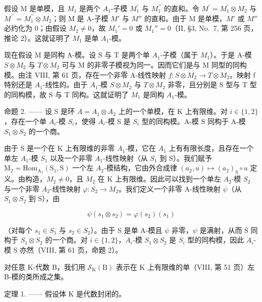 假设 M 是单模，且 \(M_{1}\) 是两个 \(A_{1}\)-子模 \(M_{1}^{\prime}\) 与 \(M_{1}^{\prime\prime}\) 的直和。令 \(M^{\prime}=M_{1}^{\prime}\otimes M_{2}\) 与 \(M^{\prime\prime}=M_{1}^{\prime\prime}\otimes M_{2}\)；则 M 是 A-子模 \(M'\) 与 \(M''\) 的直和。由于 M 是单模，\(M'\) 或 \(M''\) 必约化为 0；由假设 \(M_{2} \neq 0\)，故 \(M_{1}' = 0\) 或 \(M_{1}'' = 0\)（II, §3, No.~7, 第 256 页，推论 2）。这就证明了 \(M_{1}\) 是单 \(A_{1}\)-模。

现在假设 M 是同构 A-模。设 S 与 T 是两个单 \(A_{1}\)-子模（属于 \(M_{1}\)）。于是 A-模 \(S \otimes M_{2}\) 与 \(T \otimes M_{2}\) 可与 M 的非零子模视为同一。因而它们是与 M 同型的同构模。由注 VIII, 第 61 页，存在一个非零 A-线性映射 \(f : S \otimes M_{2} \to T \otimes M_{2}\)。映射 f 特别还是 \(A_{1}\)-线性的。由于 \(A_{1}\)-模 \(S \otimes M_{2}\) 与 \(T \otimes M_{2}\) 非零，且分别是 S 型与 T 型的同构模，故 S 与 T 同构。这就证明了 \(M_{1}\) 是同构 \(A_{1}\)-模。

命题 2. —— 设 S 是环 \(A = A_{1} \otimes A_{2}\) 上的一个单模，在 K 上有限维。对 \(i \in \{1, 2\}\)，存在一个单 \(A_{i}\)-模 \(S_{i}\)，使得 \(A_{i}\)-模 S 是 \(S_{i}\) 型的同构模。A-模 S 同构于 A-模 \(S_{1} \otimes S_{2}\) 的一个商。

由于 S 是一个在 K 上有限维的非零 \(A_{1}\)-模，它在 \(A_{1}\) 上有有限长度，且存在一个单左 \(A_{1}\)-模 \(S_{1}\) 以及一个非零 \(A_{1}\)-线性映射（从 \(S_{1}\) 到 S）。我们赋予 \(\mathrm{M}_{2} = \mathrm{Hom}_{\mathrm{A}_{1}}(\mathrm{S}_{1}, \mathrm{S})\) 一个左 \(A_{2}\)-模结构，它由外合成律 \((a_{2}, u) \mapsto (a_{2})_{\mathrm{S}} \circ u\) 定义。由构造，\(M_{2} \neq 0\)，且 \(M_{2}\) 在 K 上有限维。因此可以找到一个单左 \(A_{2}\)-模 \(S_{2}\) 与一个非零 \(A_{2}\)-线性映射 \(\varphi : S_{2} \to M_{2}\)。我们定义一个非零 A-线性映射 \(\psi\)（从 \(S_{1} \otimes S_{2}\) 到 S），由

\[
\psi (s _ {1} \otimes s _ {2}) = \varphi (s _ {2}) (s _ {1})\tag{1}
\]

（对每个 \(s_{1} \in S_{1}\) 与 \(s_{2} \in S_{2}\)）。由于 S 是单 A-模且 \(\psi\) 非零，\(\psi\) 是满射，从而 S 同构于 \(S_{1} \otimes S_{2}\) 的一个商。对 \(i \in \{1, 2\}\)，\(A_{i}\)-模 \(S_{1} \otimes S_{2}\) 是 \(S_{i}\) 型的同构模，因此 \(A_{i}\)-模 S 亦然（VIII, 第 61 页，命题 2）。

对任意 K-代数 B，我们用 \(\mathcal{S}_{\mathrm{K}}(\mathrm{B})\) 表示在 K 上有限维的单（VIII, 第 51 页）左 B-模的类所成之集。

定理 1. —— 假设体 K 是代数封闭的。

